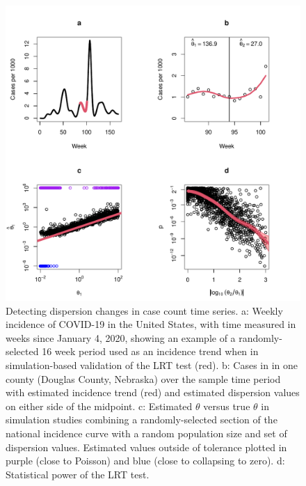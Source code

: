 \documentclass[11pt,letterpaper]{article}
\begin{document}
\clearpage
\begin{figure}[!ht]
\includegraphics[width=1\textwidth]{fig1}
\caption{
Detecting dispersion changes in case count time series. 
a: Weekly incidence of COVID-19 in the United States, with time measured in weeks since January 4, 2020, showing an example of a randomly-selected 16 week period used as an incidence trend when in simulation-based validation of the LRT test (red). 
b: Cases in in one county (Douglas County, Nebraska) over the sample time period with estimated incidence trend (red) and estimated dispersion values on either side of the midpoint. 
c: Estimated $\theta$ versus true $\theta$ in simulation studies combining a randomly-selected section of the national incidence curve with a random population size and set of dispersion values. Estimated values outside of tolerance plotted in purple (close to Poisson) and blue (close to collapsing to zero). 
d: Statistical power of the LRT test.}\label{fig1}
\end{figure}
\clearpage
\end{document}
